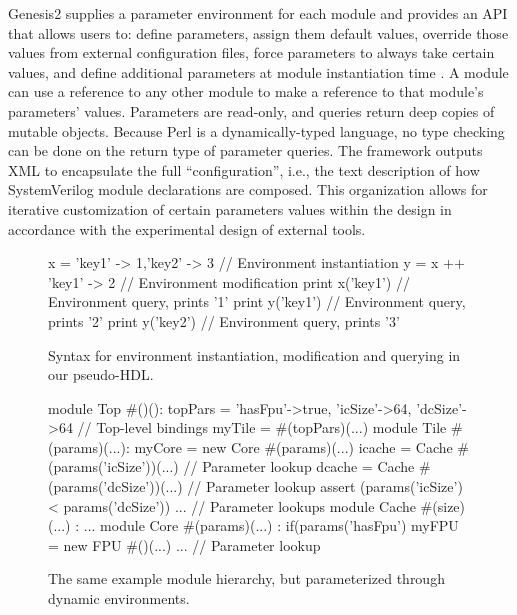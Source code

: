 Genesis2 supplies a parameter environment for each module and provides an API that allows users to:
define parameters,
assign them default values,
override those values from external configuration files,
force parameters to always take certain values,
and
define additional parameters at module instantiation time
\cite{shacham2011chip}.
A module can use a reference to any other module to make a reference to that module's parameters' values. 
Parameters are read-only, and queries return deep copies of mutable objects.
Because Perl is a dynamically-typed language, no type checking can be done on the return type of parameter queries.
The framework outputs XML to encapsulate the full ``configuration'', i.e., the text description of how SystemVerilog module declarations are composed.
This organization allows for iterative customization of certain parameters values within the design in accordance with the experimental design of external tools.

\begin{figure}
\centering
\begin{phdl}
x = {'key1' -> 1,'key2' -> 3} // Environment instantiation
y = x ++ {'key1' -> 2}        // Environment modification
print x('key1')               // Environment query, prints '1'
print y('key1')               // Environment query, prints '2'
print y('key2')               // Environment query, prints '3'
\end{phdl}
\caption{Syntax for environment instantiation, modification and querying in our pseudo-HDL.}
\label{fig:env-phdl}
\end{figure}

\begin{figure}
\centering
\begin{phdl}
module Top #()():
  topPars = {'hasFpu'->true, 'icSize'->64, 'dcSize'->64} // Top-level bindings
  myTile = #(topPars)(...)
module Tile #(params)(...):
  myCore = new Core  #(params)(...)
  icache = Cache #(params('icSize'))(...)          // Parameter lookup
  dcache = Cache #(params('dcSize'))(...)          // Parameter lookup
  assert (params('icSize') < params('dcSize')) ... // Parameter lookups
module Cache #(size)(...) : ...
module Core  #(params)(...) :
  if(params('hasFpu') myFPU = new FPU #()(...) ... // Parameter lookup
\end{phdl} 
\caption{The same example module hierarchy, but parameterized through dynamic environments.}
\label{fig:env}
\end{figure}

